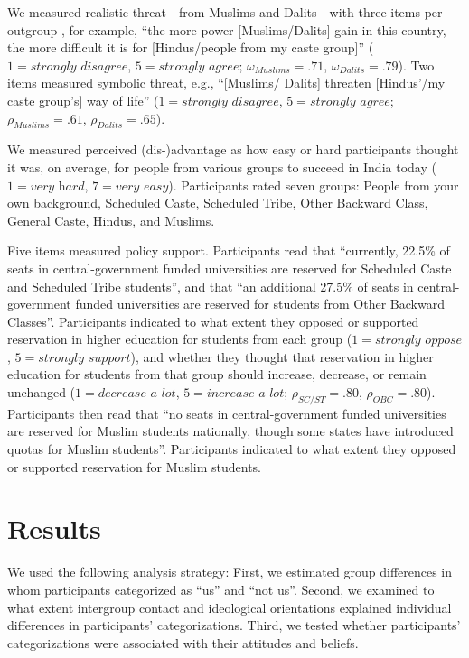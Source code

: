 \documentclass[12pt, a4paper]{article}
\begin{document}
We measured realistic threat---from Muslims and Dalits---with three items per outgroup \cite{schmid_reducing_2014}, for example, ``the more power [Muslims/Dalits] gain in this country, the more difficult it is for [Hindus/people from my caste group]'' ($1 = \textit{strongly disagree}$, $5 = \textit{strongly agree}$; $\omega_\textit{Muslims} = .71$, $\omega_\textit{Dalits} = .79$). Two items measured symbolic threat, e.g., ``[Muslims/ Dalits] threaten [Hindus'/my caste group's] way of life'' ($1 = \textit{strongly disagree}$, $5 = \textit{strongly agree}$; $\rho_\textit{Muslims} = .61$, $\rho_\textit{Dalits} = .65$).

We measured perceived (dis-)advantage as how easy or hard participants thought it was, on average, for people from various groups to succeed in India today ($1 = \textit{very hard}$, $7 = \textit{very easy}$). Participants rated seven groups: People from your own background, Scheduled Caste, Scheduled Tribe, Other Backward Class, General Caste, Hindus, and Muslims.

Five items measured policy support. Participants read that ``currently, 22.5\% of seats in central-government funded universities are reserved for Scheduled Caste and Scheduled Tribe students'', and that ``an additional 27.5\% of seats in central-government funded universities are reserved for students from Other Backward Classes''. Participants indicated to what extent they opposed or supported reservation in higher education for students from each group ($1 = \textit{strongly oppose}$, $5 = \textit{strongly support}$), and whether they thought that reservation in higher education for students from that group should increase, decrease, or remain unchanged ($1 = \textit{decrease a lot}$, $5 = \textit{increase a lot}$; $\rho_\textit{SC/ST} = .80$, $\rho_\textit{OBC} = .80$). Participants then read that ``no seats in central-government funded universities are reserved for Muslim students nationally, though some states have introduced quotas for Muslim students''. Participants indicated to what extent they opposed or supported reservation for Muslim students.

\section{Results}

We used the following analysis strategy: First, we estimated group differences in whom participants categorized as ``us'' and ``not us''. Second, we examined to what extent intergroup contact and ideological orientations explained individual differences in participants' categorizations. Third, we tested whether participants' categorizations were associated with their attitudes and beliefs.
\end{document}
